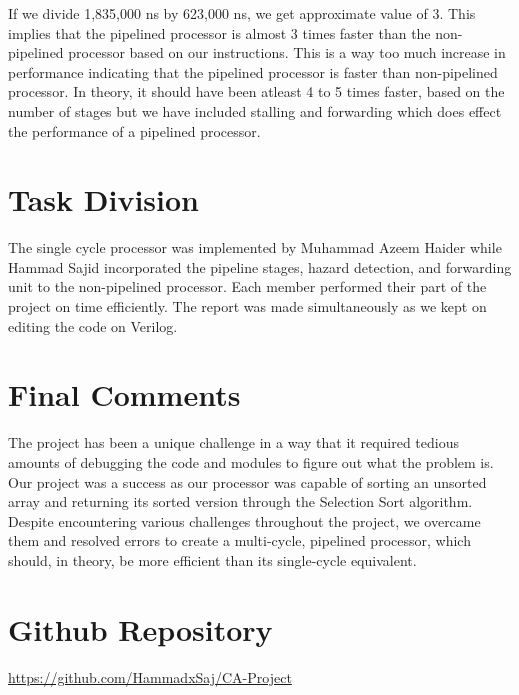 \documentclass{article}
\begin{document}
If we divide 1,835,000 ns by 623,000 ns, we get approximate value of 3. This implies that the pipelined processor is almost 3 times faster than the non-pipelined processor based on our instructions. This is a way too much increase in performance indicating that the pipelined processor is faster than non-pipelined processor. In theory, it should have been 
atleast 4 to 5 times faster, based on the number of stages but we have included stalling and forwarding which does effect the performance of a pipelined processor.

\section{Task Division}

The single cycle processor was implemented by Muhammad Azeem Haider while Hammad Sajid incorporated the pipeline stages, hazard detection, and forwarding unit to the non-pipelined processor. Each member performed their part of the project 
on time efficiently. The report was made simultaneously as we kept on editing the code on Verilog.

\section{Final Comments}
The project has been a unique challenge in a way that it required tedious amounts of debugging the code and modules to figure out what the problem is. Our project was a success as our processor was capable of sorting an unsorted array and returning its sorted version through the Selection Sort algorithm. Despite encountering various challenges throughout the project, we overcame them and resolved errors to create a multi-cycle, pipelined processor, which should, in theory, be more efficient than its single-cycle equivalent.


\section{Github Repository}

\href{https://github.com/HammadxSaj/CA-Project}{https://github.com/HammadxSaj/CA-Project}
\end{document}
